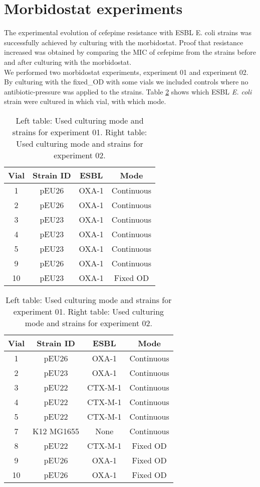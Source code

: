 \section{Morbidostat experiments}
The experimental evolution of cefepime resistance with ESBL E. coli strains was successfully achieved by culturing with the morbidostat. Proof that resistance increased was obtained by comparing the MIC of cefepime from the strains before and after culturing with the morbidostat. \\
We performed two morbidostat experiments, experiment 01 and experiment 02. By culturing with the fixed\_OD with some vials we included controls where no antibiotic-pressure was applied to the strains. Table \ref{table:vial_modes} shows which ESBL \textit{E. coli} strain were cultured in which vial, with which mode. 
\begin{table}[H]
	\begin{tabular}{|c c c c|}	
		\hline
		Vial & Strain ID & ESBL & Mode \\
		\hline
		1 & pEU26 & OXA-1 & Continuous \\
		\hline
		2 & pEU26 & OXA-1 & Continuous \\
		\hline
		3 & pEU23 & OXA-1 & Continuous \\
		\hline
		4 & pEU23 & OXA-1 & Continuous \\
		\hline
		5 & pEU23 & OXA-1 & Continuous \\
		\hline
		9 & pEU26 & OXA-1 & Continuous \\
		\hline
		10 & pEU23 & OXA-1 & Fixed OD \\
		\hline
	\end{tabular}
	\quad
	\begin{tabular}{|c c c c|}	
		\hline
		Vial & Strain ID & ESBL &Mode \\
		\hline
		1 & pEU26 & OXA-1 & Continuous \\
		\hline
		2 & pEU23 & OXA-1 & Continuous \\
		\hline
		3 & pEU22 & CTX-M-1 & Continuous \\
		\hline
		4 & pEU22 & CTX-M-1 & Continuous \\
		\hline
		5 & pEU22 & CTX-M-1 & Continuous \\
		\hline
		7 & K12 MG1655& None & Continuous \\
		\hline
		8 & pEU22 & CTX-M-1 & Fixed OD \\
		\hline
		9 & pEU26 & OXA-1 & Fixed OD \\
		\hline
		10 & pEU26 & OXA-1 & Fixed OD \\
		\hline
	\end{tabular}
	\caption{Left table: Used culturing mode and strains for experiment 01. Right table: Used culturing mode and strains for experiment 02.}
	\label{table:vial_modes}
\end{table}
